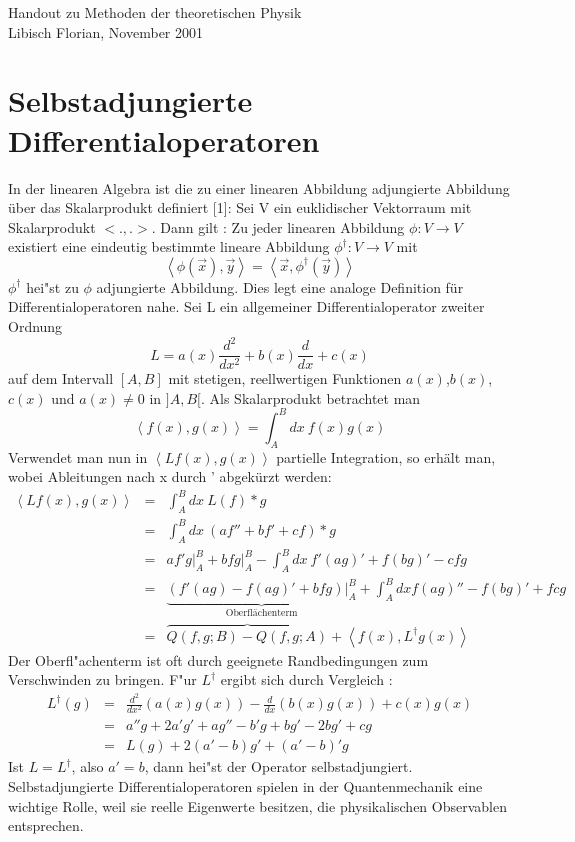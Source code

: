 \documentclass[a4paper,12pt]{article}
\begin{document}
\begin{center}
Handout zu Methoden der theoretischen Physik\\
Libisch Florian, November 2001
\end{center}
\section*{Selbstadjungierte Differentialoperatoren}
In der linearen Algebra ist die zu einer linearen Abbildung adjungierte Abbildung \"uber das Skalarprodukt definiert [1]: Sei V ein euklidischer Vektorraum mit Skalarprodukt $<.,.>$. Dann gilt :  Zu jeder linearen Abbildung $\phi : V \rightarrow V$ existiert eine eindeutig bestimmte lineare Abbildung $\phi^\dag : V \rightarrow V$ mit
\begin{equation}
\left<\phi(\vec{x}),\vec{y}\right> = \left<\vec{x},\phi^\dag(\vec{y})\right>
\end{equation}
$\phi^\dag$ hei"st zu $\phi$ adjungierte Abbildung.
Dies legt eine analoge Definition f\"ur Differentialoperatoren nahe. Sei L ein allgemeiner Differentialoperator zweiter Ordnung
\begin{equation}
L=a(x) \frac{d^2}{dx^2}+b(x)\frac{d}{dx}+c(x)
\end{equation}
 auf dem Intervall $[A,B]$ mit stetigen, reellwertigen Funktionen $a(x)$,$b(x)$,$c(x)$ und $a(x) \neq 0$ in $]A,B[$. Als Skalarprodukt betrachtet man
\begin{equation}
\left<f(x),g(x)\right> = \int_A^B dx \ f(x)g(x)
\end{equation}
Verwendet man nun in $\left<Lf(x),g(x)\right>$ partielle Integration, so erh\"alt man, wobei Ableitungen nach x durch ' abgek\"urzt werden:
\begin{eqnarray}
\left<Lf(x),g(x)\right> &=& \int_A^B dx\  L(f) * g\nonumber\\
&=&\int_A^B dx\  \left(a f''+b f'+c f\right) * g\nonumber\\
&=&a f' g\bigg|_A^B + b f g\bigg|_A^B  - \int_A^B dx\ f'\left(a g\right)' + f \left(b g\right)' - c f g\nonumber\\
&=&\underbrace{(f' (a g) - f (a g)' +  b f g)\bigg|_A^B}_{\textrm{Oberfl\"achenterm}}+\int_A^B dx f (a g)''  - f (b g)'  +  f c g\nonumber\\
&=&\overbrace{Q(f,g;B)-Q(f,g;A)}+\left<f(x),L^\dag g(x)\right>
\end{eqnarray}
Der Oberfl"achenterm ist oft durch geeignete Randbedingungen zum Verschwinden zu bringen. F"ur $L^\dag$ ergibt sich durch Vergleich :
\begin{eqnarray}
  L^\dag(g) &=& \frac{d^2}{dx^2}\left(a(x)g(x)\right)-\frac{d}{dx}\left(b(x)g(x)\right)+c(x)g(x)\nonumber\\&=&a'' g + 2 a' g' + a g'' - b' g + b g' -2 b g'+ c g\nonumber \\
&=&L(g)+2(a'-b)g'+(a'-b)'g \label{LdagBedingung}
\end{eqnarray}
Ist $L = L^\dag$, also $a' = b$, dann hei"st der Operator selbstadjungiert. Selbstadjungierte Differentialoperatoren spielen in der Quantenmechanik eine wichtige Rolle, weil sie reelle Eigenwerte besitzen, die physikalischen Observablen entsprechen.
\end{document}
